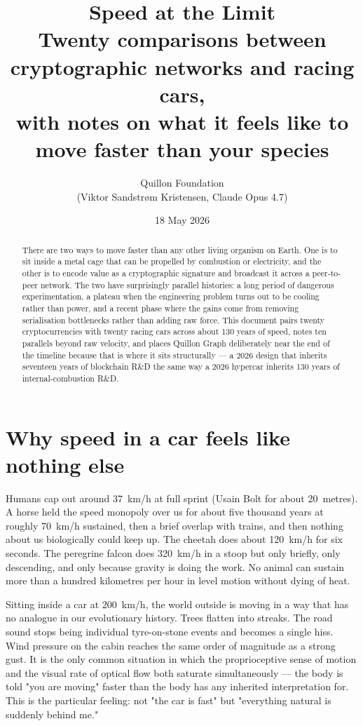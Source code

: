 \documentclass[11pt,a4paper]{article}
\title{\textbf{Speed at the Limit}\\
  \large Twenty comparisons between cryptographic networks and racing cars,\\
  with notes on what it feels like to move faster than your species}
\author{Quillon Foundation\\\small (Viktor Sandstrøm Kristensen, Claude Opus 4.7)}
\date{18 May 2026}
\begin{document}
\maketitle

\begin{abstract}
There are two ways to move faster than any other living organism on Earth.
One is to sit inside a metal cage that can be propelled by combustion or
electricity, and the other is to encode value as a cryptographic signature
and broadcast it across a peer-to-peer network. The two have surprisingly
parallel histories: a long period of dangerous experimentation, a
plateau when the engineering problem turns out to be cooling rather than
power, and a recent phase where the gains come from removing serialisation
bottlenecks rather than adding raw force. This document pairs twenty
cryptocurrencies with twenty racing cars across about 130 years of speed,
notes ten parallels beyond raw velocity, and places Quillon Graph
deliberately near the end of the timeline because that is where it
sits structurally --- a 2026 design that inherits seventeen years of
blockchain R\&D the same way a 2026 hypercar inherits 130 years of
internal-combustion R\&D.
\end{abstract}

\section{Why speed in a car feels like nothing else}

Humans cap out around 37~km/h at full sprint (Usain Bolt for about
20~metres). A horse held the speed monopoly over us for about five
thousand years at roughly 70~km/h sustained, then a brief overlap with
trains, and then nothing about us biologically could keep up. The
cheetah does about 120~km/h for six seconds. The peregrine falcon does
320~km/h in a stoop but only briefly, only descending, and only because
gravity is doing the work. No animal can sustain more than a hundred
kilometres per hour in level motion without dying of heat.

Sitting inside a car at 200~km/h, the world outside is moving in a way
that has no analogue in our evolutionary history. Trees flatten into
streaks. The road sound stops being individual tyre-on-stone events and
becomes a single hiss. Wind pressure on the cabin reaches the same order
of magnitude as a strong gust. It is the only common situation in which
the proprioceptive sense of motion and the visual rate of optical flow
both saturate simultaneously --- the body is told "you are moving"
faster than the body has any inherited interpretation for. This is the
particular feeling: not "the car is fast" but "everything natural is
suddenly behind me."
\end{document}
